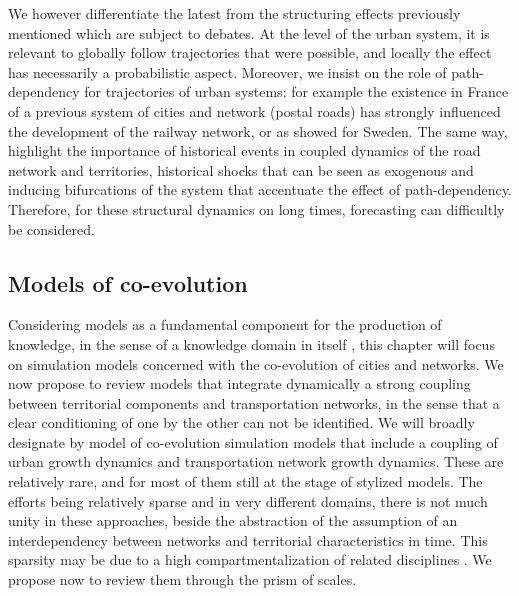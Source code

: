 \documentclass[11pt]{article}
\begin{document}
We however differentiate the latest from the structuring effects previously mentioned which are subject to debates. At the level of the urban system, it is relevant to globally follow trajectories that were possible, and locally the effect has necessarily a probabilistic aspect. Moreover, we insist on the role of path-dependency for trajectories of urban systems: for example the existence in France of a previous system of cities and network (postal roads) has strongly influenced the development of the railway network, or as \cite{berger2017locomotives} showed for Sweden. The same way, \cite{doi:10.1068/b39089} highlight the importance of historical events in coupled dynamics of the road network and territories, historical shocks that can be seen as exogenous and inducing bifurcations of the system that accentuate the effect of path-dependency. Therefore, for these structural dynamics on long times, forecasting can difficultly be considered.


\subsection{Models of co-evolution}

Considering models as a fundamental component for the production of knowledge, in the sense of a knowledge domain in itself \citep{raimbault2017applied}, this chapter will focus on simulation models concerned with the co-evolution of cities and networks. We now propose to review models that integrate dynamically a strong coupling between territorial components and transportation networks, in the sense that a clear conditioning of one by the other can not be identified. We will broadly designate by model of co-evolution simulation models that include a coupling of urban growth dynamics and transportation network growth dynamics. These are relatively rare, and for most of them still at the stage of stylized models. The efforts being relatively sparse and in very different domains, there is not much unity in these approaches, beside the abstraction of the assumption of an interdependency between networks and territorial characteristics in time. This sparsity may be due to a high compartmentalization of related disciplines \citep{raimbault2017models}. We propose now to review them through the prism of scales.

\end{document}
